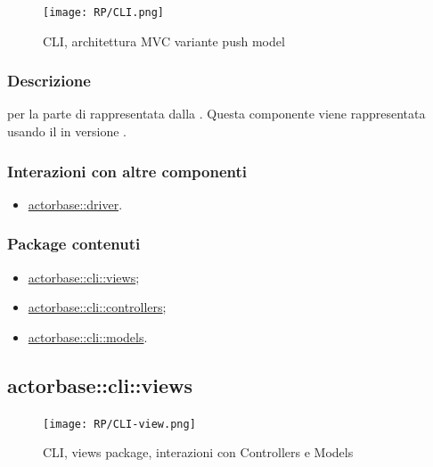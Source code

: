 \documentclass{scalatekids-article}
\begin{document}
\begin{figure}[H]
  \begin{center}
    \texttt{[image: RP/CLI.png]}
    \caption{CLI, architettura MVC variante push model}
  \end{center}
\end{figure}

\subsubsection{Descrizione}

 per la parte di  rappresentata dalla .
Questa componente viene rappresentata usando il 
 in versione .

\subsubsection{Interazioni con altre componenti}

\begin{itemize}
\item \hyperref[sec:actorbase::driver]{actorbase::driver}.
\end{itemize}

\subsubsection{Package contenuti}

\begin{itemize}
\item \hyperref[sec:actorbase::cli::views]{actorbase::cli::views};
\item \hyperref[sec:actorbase::cli::controllers]{actorbase::cli::controllers};
\item \hyperref[sec:actorbase::cli::models]{actorbase::cli::models}.
\end{itemize}

\subsection{actorbase::cli::views}
\label{sec:actorbase::cli::views}

\begin{figure}[H]
  \begin{center}
    \texttt{[image: RP/CLI-view.png]}
    \caption{CLI, views package, interazioni con Controllers e Models}
  \end{center}
\end{figure}
\end{document}
